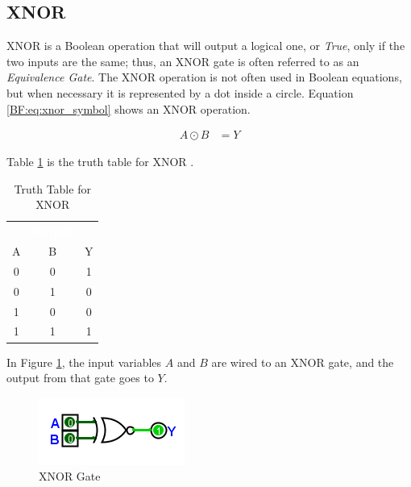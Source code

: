 \subsection{XNOR}
\label{BF:subsec:xnor}

\textsf{XNOR} is a Boolean operation that will output a logical one, or \emph{True}, only if the two inputs are the same; thus, an \textsf{XNOR} gate is often referred to as an \emph{Equivalence Gate}. The \textsf{XNOR} operation is not often used in Boolean equations, but when necessary it is represented by a dot inside a circle. Equation \ref{BF:eq:xnor_symbol} shows an \textsf{XNOR}  operation. 

\begin{align}
  \label{BF:eq:xnor_symbol}
  A \odot B &= Y
\end{align}

Table \ref{BF:tab:truth_table_for_xnor} is the truth table for \textsf{XNOR} . 

\begin{table}[H]
  \sffamily
  \newcommand{\head}[1]{\textcolor{white}{\textbf{#1}}}    
  \begin{center}
    \begin{tabular}{ccc} 
      \rowcolor{black!75}
      \multicolumn{2}{c}{\head{Inputs}} & \head{Output} \\
      A & B & Y \\
      \hline
      0 & 0 & 1 \\
      0 & 1 & 0 \\
      1 & 0 & 0 \\
      1 & 1 & 1 
    \end{tabular}
  \end{center}
  \caption{Truth Table for XNOR}
  \label{BF:tab:truth_table_for_xnor}
\end{table}

In Figure \ref{fig:04_08}, the input variables $ A $ and $ B $ are wired to an \textsf{XNOR}  gate, and the output from that gate goes to $ Y $. 

\begin{figure}[H]
	\centering
	\includegraphics[width=\maxwidth{.95\linewidth}]{gfx/04_08}
	\caption{XNOR Gate}
	\label{fig:04_08}
\end{figure}


